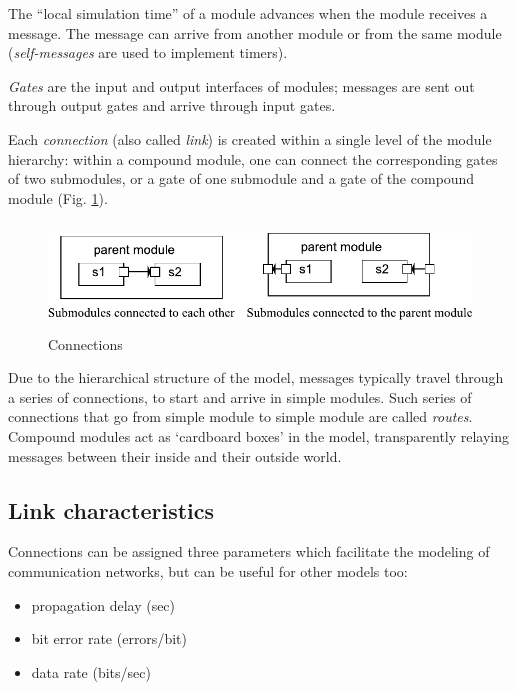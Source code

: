 The ``local simulation time'' of a module advances when the module
receives a message. The message can arrive from another module
or from the same module (\textit{self-messages} are used to implement
timers).


\textit{Gates} are the input and output interfaces of
modules; messages are sent out through output gates and arrive through
input gates.

Each \textit{connection} (also called
\textit{link}) is created within a single level of the
module hierarchy: within a compound module, one can connect the
corresponding gates of two submodules, or a gate of one submodule and
a gate of the compound module (Fig.
\ref{fig:ch-overview:connections}).

\begin{figure}[htbp]
\begin{center}
\includegraphics[width=5.061in, height=1.121in]{figures/usmanFig3}
\caption{Connections}
\label{fig:ch-overview:connections}
\end{center}
\end{figure}

Due to the hierarchical structure of the model, messages typically
travel through a series of connections, to start and arrive in simple
modules. Such series of connections that go from simple module to
simple module are called \textit{routes}.  Compound modules act as
`cardboard boxes' in the model, transparently relaying messages
between their inside and their outside world.


\subsection{Link characteristics}

Connections can be assigned three parameters which facilitate
the modeling of communication networks, but can be useful for
other models too:
\begin{itemize}
  \item{propagation delay (sec)}
  \item{bit error rate (errors/bit)}
  \item{data rate (bits/sec)}
\end{itemize}



